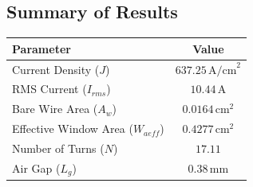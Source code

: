\documentclass{article}
\begin{document}
	\subsection*{Summary of Results}
	\begin{tabular}{|l|c|}
		\hline
		\textbf{Parameter} & \textbf{Value} \\
		\hline
		Current Density (\(J\)) & \(637.25 \, \text{A/cm}^2\) \\
		RMS Current (\(I_{rms}\)) & \(10.44 \, \text{A}\) \\
		Bare Wire Area (\(A_w\)) & \(0.0164 \, \text{cm}^2\) \\
		Effective Window Area (\(W_{aeff}\)) & \(0.4277 \, \text{cm}^2\) \\
		Number of Turns (\(N\)) & \(17.11\) \\
		Air Gap (\(L_g\)) & \(0.38 \, \text{mm}\) \\
		\hline
	\end{tabular}
	
\end{document}
